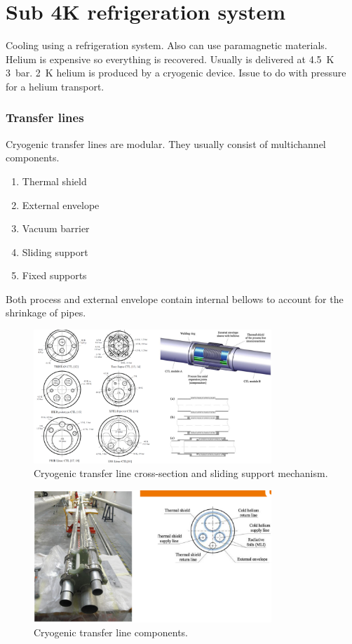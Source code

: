 \section{Sub 4K refrigeration system}
Cooling using a refrigeration system. Also can use paramagnetic materials. Helium is expensive so everything is recovered. Usually  is delivered at \SI{4.5}{\kelvin} \SI{3}{bar}. \SI{2}{\kelvin} helium is produced by a cryogenic device. Issue to do with pressure for a helium transport.
\subsubsection{Transfer lines}
Cryogenic transfer lines are modular. They usually consist of multichannel components.
\begin{enumerate}
    \item Thermal shield
    \item External envelope
    \item Vacuum barrier
    \item Sliding support
    \item Fixed supports
\end{enumerate}
Both process and external envelope contain internal bellows to account for the shrinkage of pipes.
\begin{figure}[H]
    \centering
    \includegraphics[width = 0.8\textwidth]{img/figure67.png}
    \caption{Cryogenic transfer line cross-section and sliding support mechanism.}
\end{figure}
\begin{figure}[H]
    \centering
    \includegraphics[width = 0.8\textwidth]{img/figure68.png}
    \caption{Cryogenic transfer line components.}
\end{figure}
